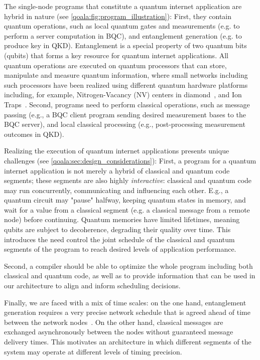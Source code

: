 The single-node programs that constitute a quantum internet application are hybrid in nature (see \cref{qoala:fig:program_illustration}):
First, they contain quantum operations, such as local quantum gates and measurements (e.g. to perform a server computation in BQC), and entanglement generation (e.g. to produce key in QKD). Entanglement is a special property of two quantum bits (qubits) that forms a key resource for quantum internet applications. 
All quantum operations are executed on quantum processors that can store, manipulate and measure quantum information, where small networks including such processors have been realized using different quantum hardware platforms including, for example,  Nitrogen-Vacancy (NV) centers in diamond~\cite{pompili2021realization}, and Ion Traps~\cite{krutyanskiy2023entanglement}.
Second, programs need to perform classical operations, such as message passing (e.g., a BQC client program sending desired measurement bases to the BQC server), and local classical processing (e.g., post-processing measurement outcomes in QKD).

Realizing the execution of quantum internet applications presents unique challenges (see \cref{qoala:sec:design_considerations}): 
First, a program for a quantum internet application is not merely a hybrid of classical and quantum code segments; these segments are also highly \textit{interactive}: classical and quantum code may run concurrently, communicating and influencing each other.
E.g., a quantum circuit may "pause" halfway, keeping quantum states in memory, and wait for a value from a classical segment (e.g. a classical message from a remote node) before continuing.
Quantum memories have limited lifetimes, meaning qubits are subject to decoherence, degrading their quality over time. This introduces the need 
control the joint schedule of the classical and quantum segments of the program to reach desired levels of application performance.

Second, a compiler should be able to optimize the whole program including both classical and quantum code, as well as to provide information that can be used in our architecture to align and inform scheduling decisions. 

Finally, we are faced with a mix of time scales:
on the one hand, entanglement generation requires a very precise network schedule that is agreed ahead of time between the network nodes~\cite{dahlberg2019link}. On the other hand, classical messages are exchanged asynchronously between the nodes without guaranteed message delivery times. This motivates an architecture in which different segments of the system may operate at different levels of timing precision. 

